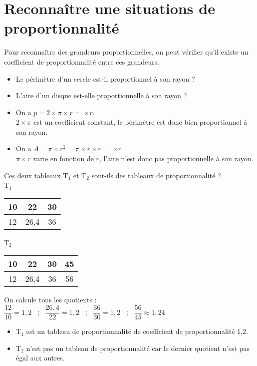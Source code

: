 \section{Reconnaître une situations de proportionnalité} %

\begin{methode*2*2}
   Pour reconnaître des grandeurs proportionnelles, on peut vérifier qu'il existe un coefficient de proportionnalité entre ces grandeurs.
   \exercice
      \begin{itemize}
         \item Le périmètre d'un cercle est-il proportionnel à son rayon ?
         \item L'aire d'un disque est-elle proportionnelle à son rayon ?
      \end{itemize}
   \correction
      \begin{itemize}
         \item On a $p =2\times \pi\times r =\;$\fbox{$2\times\pi$}$\times r$. \\
            $2\times\pi$ est un coefficient constant, le périmètre est donc bien proportionnel à son rayon.
         \item On a $A =\pi\times r^2 =\pi\times r\times r =\;$$\times r$. \\
      $\pi\times r$ varie en fonction de $r$, l'aire n'est donc pas proportionnelle à son rayon.
      \end{itemize}
   \exercice
      Ces deux tableaux T$_1$ et T$_2$ sont-ils des tableaux de proportionnalité ? \\ [2mm]
   T$_1$
      {\renewcommand{\arraystretch}{1.2}
      \begin{tabular}{|c|c|c|}
         \hline
         10 & 22 & 30 \\
         \hline
         12 & 26,4 & 36 \\
         \hline
      \end{tabular}
      \quad
      T$_2$
      \begin{tabular}{|c|c|c|c|}
         \hline
         10 & 22 & 30 & 45 \\
         \hline
         12 & 26,4 & 36 & 56 \\
         \hline
      \end{tabular}}
   \correction
      On calcule tous les quotients : \\ [2mm]
      $\dfrac{12}{10} =1,2$ \, ; \, $\dfrac{26,4}{22} =1,2$ \, ; \, $\dfrac{36}{30} =1,2$ \, ; \, $\dfrac{56}{45} \approx1,24$. \medskip
      \begin{itemize}
         \item T$_1$ est un tableau de proportionnalité de coefficient de proportionnalité 1,2.
         \item T$_2$ n'est pas un tableau de proportionnalité car le dernier quotient n'est pas égal aux autres.
      \end{itemize}
\end{methode*2*2}
